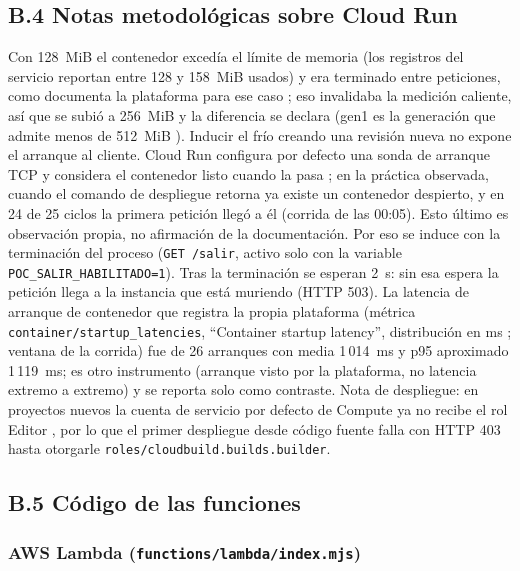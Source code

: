 \subsection*{B.4 Notas metodológicas sobre Cloud Run}

Con 128~MiB el contenedor excedía el límite de memoria (los registros del servicio
reportan entre 128 y 158~MiB usados) y era terminado entre peticiones, como documenta
la plataforma para ese caso \parencite{gcrMemoryLimits}; eso invalidaba la medición
caliente, así que se subió a 256~MiB y la diferencia se declara (gen1 es la generación
que admite menos de 512~MiB \parencite{gcrExecEnv}).
Inducir el frío creando una revisión nueva \parencite{gcrResourceModel} no expone el
arranque al cliente. Cloud Run configura por defecto una sonda de arranque TCP y
considera el contenedor listo cuando la pasa \parencite{gcrHealthchecks,gcrContainerContract};
en la práctica observada, cuando el comando de despliegue retorna ya existe un contenedor
despierto, y en 24 de 25 ciclos la primera petición llegó a él (corrida de las 00:05).
Esto último es observación propia, no afirmación de la documentación. Por eso se induce con la terminación del proceso
(\texttt{GET /salir}, activo solo con la variable \texttt{POC\_SALIR\_HABILITADO=1}).
Tras la terminación se esperan 2~s: sin esa espera la petición llega a la instancia
que está muriendo (HTTP 503). La latencia de arranque de contenedor que registra la
propia plataforma (métrica \texttt{container/startup\_latencies}, ``Container startup
latency'', distribución en ms \parencite{gcpMetricsRun,gcrMonitoring}; ventana de la
corrida) fue de 26 arranques con media 1\,014~ms y p95 aproximado 1\,119~ms;
es otro instrumento (arranque visto por la plataforma, no latencia extremo a
extremo) y se reporta solo como contraste. Nota de despliegue: en proyectos nuevos la
cuenta de servicio por defecto de Compute ya no recibe el rol Editor
\parencite{gcpOrgPolicySA}, por lo que el primer despliegue desde código fuente falla
con HTTP 403 hasta otorgarle \texttt{roles/cloudbuild.builds.builder}.

\subsection*{B.5 Código de las funciones}

\subsubsection*{AWS Lambda (\texttt{functions/lambda/index.mjs})}
\inputminted[fontsize=\scriptsize, breaklines]{javascript}{assets/code/lambda-index.mjs}

